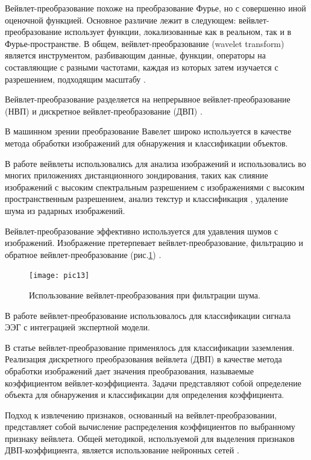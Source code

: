 \documentclass[a4paper,14pt]{extreport}
\begin{document}
Вейвлет-преобразование похоже на преобразование Фурье, но с совершенно иной оценочной функцией. Основное различие лежит в следующем: вейвлет-преобразование использует функции, локализованные как в реальном, так и в Фурье-пространстве. В общем, вейвлет-преобразование (wavelet transform) является инструментом, разбивающим данные, функции, операторы на составляющие с разными частотами, каждая из которых затем изучается с разрешением, подходящим масштабу \cite{2wl}.

Вейвлет-преобразование разделяется на непрерывное вейвлет-преобразование (НВП) \cite{3wl} и дискретное вейвлет-преобразование (ДВП) \cite{1wl}.

В машинном зрении преобразование Вавелет широко используется в качестве метода обработки изображений для обнаружения и классификации объектов.

В работе \cite{5wl} вейвлеты использовались для анализа изображений и использовались во многих приложениях дистанционного зондирования, таких как слияние изображений с высоким спектральным разрешением с изображениями с высоким пространственным разрешением, анализ текстур и классификация \cite{6wl}, удаление шума из радарных изображений.

Вейвлет-преобразование эффективно используется для удавления шумов с изображений. Изображение претерпевает вейвлет-преобразование, фильтрацию и обратное вейвлет-преобразование (рис.\ref{pic13}) \cite{8wl}.
\begin{figure}[ht!]
\centering
\texttt{[image: pic13]}
\caption{Использование вейвлет-преобразования при фильтрации шума.}
	\label{pic13}
	\end{figure}
В работе \cite{9wl} вейвлет-преобразование использовалось для классификации сигнала ЭЭГ с интеграцией экспертной модели.

В статье \cite{10wl} вейвлет-преобразование применялось для классификации заземления. Реализация дискретного преобразования вейвлета (ДВП) в качестве метода обработки изображений дает значения преобразования, называемые коэффициентом вейвлет-коэффициента. Задачи представляют собой определение объекта для обнаружения и классификации для  определения коэффициента.

Подход к извлечению признаков, основанный на вейвлет-преобразовании, представляет собой вычисление распределения коэффициентов по выбранному признаку вейвлета. Общей методикой, используемой для выделения признаков ДВП-коэффициента, является использование нейронных сетей \cite{11wl, 12wl, 13wl}.
\end{document}
